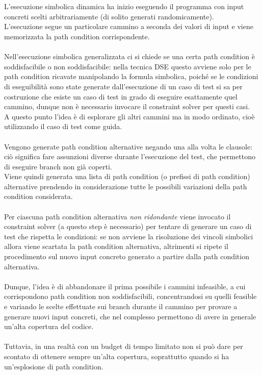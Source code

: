 \documentclass[a4paper, 12pt, oneside]{book}
\theoremstyle{normal}
\begin{document}
\\ \\ L'esecuzione simbolica dinamica ha inizio eseguendo il programma con input concreti scelti arbitrariamente (di solito generati randomicamente). \\ L'esecuzione segue un particolare cammino a seconda dei valori di input e viene memorizzata la path condition corrispondente. \\ \\ Nell'esecuzione simbolica generalizzata ci si chiede se una certa path condition è soddisfacibile o non soddisfacibile: nella tecnica DSE questo avviene solo per le path condition ricavate manipolando la formula simbolica, poiché se le condizioni di eseguibilità sono state generate dall'esecuzione di un caso di test si sa per costruzione che esiste un caso di test in grado di eseguire esattamente quel cammino, dunque non è necessario invocare il constraint solver per questi casi. \\ A questo punto l'idea è di esplorare gli altri cammini ma in modo ordinato, cioè utilizzando il caso di test come guida. \\ \\ Vengono generate path condition alternative negando una alla volta le clausole: ciò significa fare assunzioni diverse durante l'esecuzione del test, che permettono di eseguire branch non già coperti. \\ Viene quindi generata una lista di path condition (o prefissi di path condition) alternative prendendo in considerazione tutte le possibili variazioni della path condition considerata. \\ \\ Per ciascuna path condition alternativa \emph{non ridondante} viene invocato il constraint solver (a questo step è necessario) per tentare di generare un caso di test che rispetta le condizioni: se non avviene la risoluzione dei vincoli simbolici allora viene scartata la path condition alternativa, altrimenti si ripete il procedimento sul nuovo input concreto generato a partire dalla path condition alternativa. \\ \\ Dunque, l'idea è di abbandonare il prima possibile i cammini infeasible, a cui corrispondono path condition non soddisfacibili, concentrandosi su quelli feasible e variando le scelte effettuate sui branch durante il cammino per provare a generare nuovi input concreti, che nel complesso permettono di avere in generale un'alta copertura del codice. \\ \\ Tuttavia, in una realtà con un budget di tempo limitato non si può dare per scontato di ottenere sempre un'alta copertura, soprattutto quando si ha un'esplosione di path condition.
\end{document}
